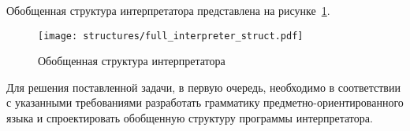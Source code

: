 Обобщенная структура интерпретатора представлена на рисунке~\ref{f:full_interpreter_struct}.

\begin{figure}[ht]
	\centering
	\vspace{\toppaddingoffigure}
	\texttt{[image: structures/full\_interpreter\_struct.pdf]}
	\caption{Обобщенная структура интерпретатора}
	\label{f:full_interpreter_struct}
\end{figure}

Для решения поставленной задачи, в первую очередь, необходимо в соответствии с указанными требованиями
разработать грамматику предметно-ориентированного языка и спроектировать обобщенную структуру программы интерпретатора.




